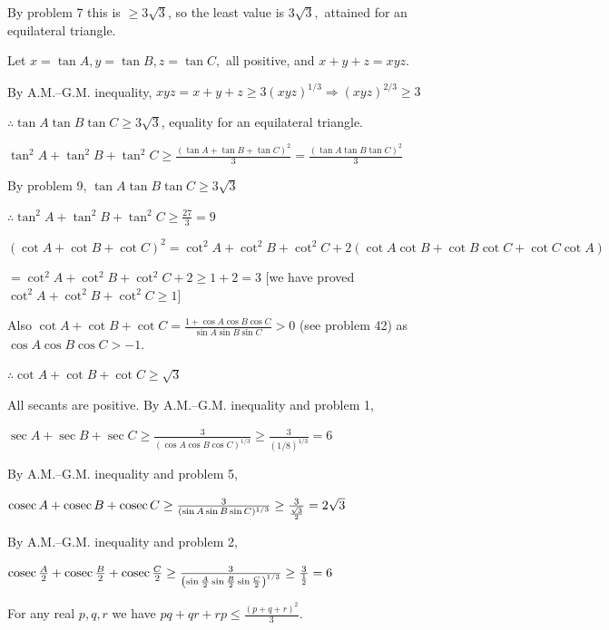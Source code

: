   By problem 7 this is $\geq 3\sqrt{3}$, so the least value is $3\sqrt{3},$ attained for an equilateral triangle.

\item Let $x = \tan A, y = \tan B, z = \tan C,$ all positive, and $x + y + z = xyz$.

  By A.M.--G.M. inequality, $xyz = x + y + z \geq 3(xyz)^{1/3} \Rightarrow (xyz)^{2/3} \geq 3$

  $\therefore \tan A\tan B\tan C \geq 3\sqrt{3}$, equality for an equilateral triangle.

\item $\tan^2A + \tan^2B + \tan^2C \geq \frac{(\tan A + \tan B + \tan C)^2}{3} = \frac{(\tan A\tan B\tan C)^2}{3}$

  By problem 9, $\tan A\tan B\tan C \geq 3\sqrt{3}$

  $\therefore \tan^2A + \tan^2B + \tan^2C \geq \frac{27}{3} = 9$

\item $(\cot A + \cot B + \cot C)^2 = \cot^2A + \cot^2B + \cot^2C + 2(\cot A\cot B + \cot B\cot C + \cot C\cot A)$

  $= \cot^2A + \cot^2B + \cot^2C + 2 \geq 1 + 2 = 3$ [we have proved $\cot^2A + \cot^2B + \cot^2C \geq 1$]

  Also $\cot A + \cot B + \cot C = \frac{1 + \cos A\cos B\cos C}{\sin A\sin B\sin C} > 0$ (see problem 42) as $\cos
  A\cos B\cos C > -1$.

  $\therefore \cot A + \cot B + \cot C \geq \sqrt{3}$

\item All secants are positive. By A.M.--G.M. inequality and problem 1,

  $\sec A + \sec B + \sec C \geq \frac{3}{(\cos A\cos B\cos C)^{1/3}} \geq \frac{3}{(1/8)^{1/3}} = 6$

\item By A.M.--G.M. inequality and problem 5,

  ${\rm cosec}\,A + {\rm cosec}\,B + {\rm cosec}\,C \geq \frac{3}{(\sin A\sin B\sin C)^{1/3}} \geq
  \frac{3}{\frac{\sqrt{3}}{2}} = 2\sqrt{3}$

\item By A.M.--G.M. inequality and problem 2,

  ${\rm cosec}\,\frac{A}{2} + {\rm cosec}\,\frac{B}{2} + {\rm cosec}\,\frac{C}{2} \geq
  \frac{3}{\left(\sin\frac{A}{2}\sin\frac{B}{2}\sin\frac{C}{2}\right)^{1/3}} \geq \frac{3}{\frac{1}{2}} = 6$

\item For any real $p, q, r$ we have $pq + qr + rp \leq \frac{(p + q + r)^2}{3}$.

